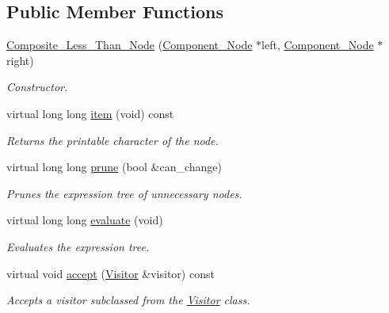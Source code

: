 \subsection*{Public Member Functions}
\begin{DoxyCompactItemize}
\item 
\hyperlink{classMadara_1_1Expression__Tree_1_1Composite__Less__Than__Node_a208f9c05da1662418d7d0772fc6f4a9a}{Composite\_\-Less\_\-Than\_\-Node} (\hyperlink{classMadara_1_1Expression__Tree_1_1Component__Node}{Component\_\-Node} $\ast$left, \hyperlink{classMadara_1_1Expression__Tree_1_1Component__Node}{Component\_\-Node} $\ast$right)
\begin{DoxyCompactList}\small\item\em Constructor. \item\end{DoxyCompactList}\item 
virtual long long \hyperlink{classMadara_1_1Expression__Tree_1_1Composite__Less__Than__Node_a0e232fa0538a625cf2650fa600c74ad4}{item} (void) const 
\begin{DoxyCompactList}\small\item\em Returns the printable character of the node. \item\end{DoxyCompactList}\item 
virtual long long \hyperlink{classMadara_1_1Expression__Tree_1_1Composite__Less__Than__Node_a351204dc5331c772933a725e367a1fe5}{prune} (bool \&can\_\-change)
\begin{DoxyCompactList}\small\item\em Prunes the expression tree of unnecessary nodes. \item\end{DoxyCompactList}\item 
virtual long long \hyperlink{classMadara_1_1Expression__Tree_1_1Composite__Less__Than__Node_a659a1eff1ee173334ae5fc4cb90c2c44}{evaluate} (void)
\begin{DoxyCompactList}\small\item\em Evaluates the expression tree. \item\end{DoxyCompactList}\item 
virtual void \hyperlink{classMadara_1_1Expression__Tree_1_1Composite__Less__Than__Node_afac850cf366738cdfd9079235c8dcfe0}{accept} (\hyperlink{classMadara_1_1Expression__Tree_1_1Visitor}{Visitor} \&visitor) const 
\begin{DoxyCompactList}\small\item\em Accepts a visitor subclassed from the \hyperlink{classMadara_1_1Expression__Tree_1_1Visitor}{Visitor} class. \item\end{DoxyCompactList}\item 

\end{DoxyCompactItemize}
